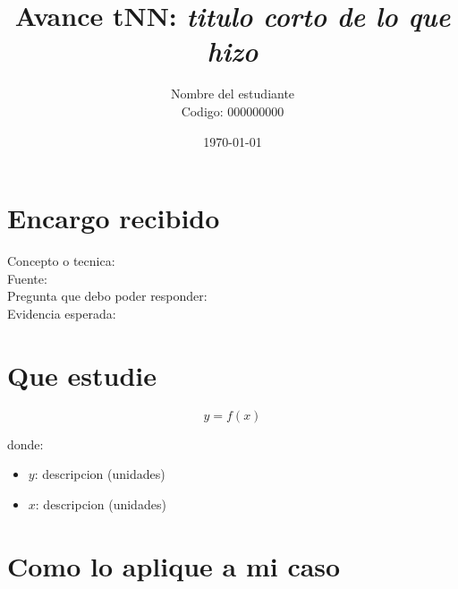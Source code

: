 \documentclass[11pt,letterpaper]{article}
\title{Avance tNN: \textit{titulo corto de lo que hizo}}
\author{Nombre del estudiante \\ Codigo: 000000000}
\date{\today}
\begin{document}
\maketitle

\section{Encargo recibido}

\begin{description}
  \item[Concepto o tecnica:]
  \item[Fuente:]
  \item[Pregunta que debo poder responder:]
  \item[Evidencia esperada:]
\end{description}

\section{Que estudie}

\begin{equation}
  y = f(x)
\end{equation}

donde:

\begin{itemize}
  \item $y$: descripcion (unidades)
  \item $x$: descripcion (unidades)
\end{itemize}

\section{Como lo aplique a mi caso}
\end{document}
